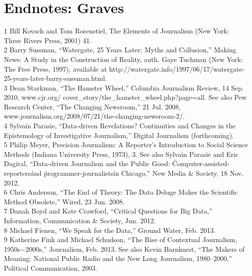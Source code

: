 \section{Endnotes: Graves}
1 Bill Kovach and Tom Rosenstiel, The Elements of Journalism (New York: Three Rivers Press, 2001) 41.\\
2 Barry Sussman, ``Watergate, 25 Years Later: Myths and Collusion,'' Making News: A Study in the
Construction of Reality, auth. Gaye Tuchman (New York: The Free Press, 1997), available at
http://watergate.info/1997/06/17/watergate-25-years-later-barry-sussman.html.\\
3 Dean Starkman, ``The Hamster Wheel,'' Columbia Journalism Review, 14 Sep. 2010, www.cjr.org/
cover_story/the_hamster_wheel.php?page=all. See also Pew Research Center, ``The Changing
Newsroom,'' 21 Jul. 2008, www.journalism.org/2008/07/21/the-changing-newsroom-2/.\\
4 Sylvain Parasie, ``Data-driven Revelations? Continuities and Changes in the Epistemology of
Investigative Journalism,'' Digital Journalism (forthcoming).\\
5 Philip Meyer, Precision Journalism: A Reporter's Introduction to Social Science Methods
(Indiana University Press, 1973), 3. See also Sylvain Parasie and Eric Dagiral, ``Data-driven Journalism and the Public Good: \'Computer-assisted-reporters\' and \'programmer-journalists\'in Chicago,'' New Media & Society, 18 Nov. 2012.\\
6 Chris Anderson, ``The End of Theory: The Data Deluge Makes the Scientific Method Obsolete,''
Wired, 23 Jun. 2008.\\
7 Danah Boyd and Kate Crawford, ``Critical Questions for Big Data,'' Information, Communication &
Society, Jun. 2012.\\
8 Michael Fienen, ``We Speak for the Data,'' Ground Water, Feb. 2013.\\
9 Katherine Fink and Michael Schudson, ``The Rise of Contextual Journalism, 1950s−2000s,''
Journalism, Feb. 2013. See also Kevin Barnhurst, ``The Makers of Meaning: National Public Radio
and the New Long Journalism, 1980–2000,'' Political Communication, 2003.\\

